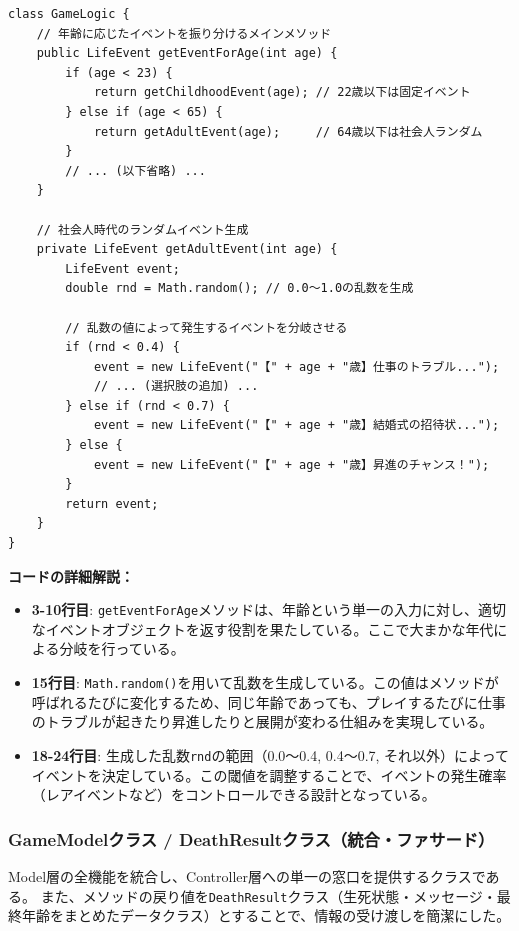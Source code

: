 \documentclass[a4paper,11pt]{jsarticle}
\begin{document}
\begin{lstlisting}[caption=GameLogic.java（イベント生成の抜粋）, label=code:logic_detail]
class GameLogic {
    // 年齢に応じたイベントを振り分けるメインメソッド
    public LifeEvent getEventForAge(int age) {
        if (age < 23) {
            return getChildhoodEvent(age); // 22歳以下は固定イベント
        } else if (age < 65) {
            return getAdultEvent(age);     // 64歳以下は社会人ランダム
        } 
        // ... (以下省略) ...
    }

    // 社会人時代のランダムイベント生成
    private LifeEvent getAdultEvent(int age) {
        LifeEvent event;
        double rnd = Math.random(); // 0.0〜1.0の乱数を生成

        // 乱数の値によって発生するイベントを分岐させる
        if (rnd < 0.4) {
            event = new LifeEvent("【" + age + "歳】仕事のトラブル...");
            // ... (選択肢の追加) ...
        } else if (rnd < 0.7) {
            event = new LifeEvent("【" + age + "歳】結婚式の招待状...");
        } else {
            event = new LifeEvent("【" + age + "歳】昇進のチャンス！");
        }
        return event;
    }
}
\end{lstlisting}

\textbf{コードの詳細解説：}
\begin{itemize}
    \item \textbf{3-10行目}: \texttt{getEventForAge}メソッドは、年齢という単一の入力に対し、適切なイベントオブジェクトを返す役割を果たしている。ここで大まかな年代による分岐を行っている。
    \item \textbf{15行目}: \texttt{Math.random()}を用いて乱数を生成している。この値はメソッドが呼ばれるたびに変化するため、同じ年齢であっても、プレイするたびに仕事のトラブルが起きたり昇進したりと展開が変わる仕組みを実現している。
    \item \textbf{18-24行目}: 生成した乱数\texttt{rnd}の範囲（0.0〜0.4, 0.4〜0.7, それ以外）によってイベントを決定している。この閾値を調整することで、イベントの発生確率（レアイベントなど）をコントロールできる設計となっている。
\end{itemize}



\subsubsection{GameModelクラス / DeathResultクラス（統合・ファサード）}
Model層の全機能を統合し、Controller層への単一の窓口を提供するクラスである。
また、メソッドの戻り値を\texttt{DeathResult}クラス（生死状態・メッセージ・最終年齢をまとめたデータクラス）とすることで、情報の受け渡しを簡潔にした。
\end{document}
